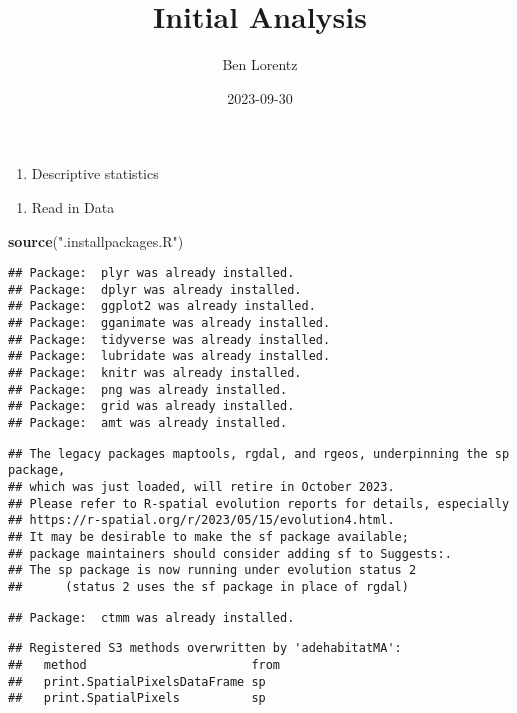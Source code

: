 \documentclass[
]{article}
\title{Initial Analysis}
\author{Ben Lorentz}
\date{2023-09-30}
\newenvironment{Shaded}{\begin{snugshade}}{\end{snugshade}}
\newcommand{\FunctionTok}[1]{\textcolor[rgb]{0.13,0.29,0.53}{\textbf{#1}}}
\newcommand{\NormalTok}[1]{#1}
\newcommand{\StringTok}[1]{\textcolor[rgb]{0.31,0.60,0.02}{#1}}
\providecommand{\tightlist}{%
  \setlength{\itemsep}{0pt}\setlength{\parskip}{0pt}}
\begin{document}
\maketitle

\begin{enumerate}
\def\labelenumi{\arabic{enumi}.}
\tightlist
\item
  Descriptive statistics
\end{enumerate}

\begin{enumerate}
\def\labelenumi{\alph{enumi}.}
\tightlist
\item
  Read in Data
\end{enumerate}

\begin{Shaded}
\begin{Highlighting}[]
\FunctionTok{source}\NormalTok{(}\StringTok{".installpackages.R"}\NormalTok{)}
\end{Highlighting}
\end{Shaded}

\begin{verbatim}
## Package:  plyr was already installed.
## Package:  dplyr was already installed.
## Package:  ggplot2 was already installed.
## Package:  gganimate was already installed.
## Package:  tidyverse was already installed.
## Package:  lubridate was already installed.
## Package:  knitr was already installed.
## Package:  png was already installed.
## Package:  grid was already installed.
## Package:  amt was already installed.
\end{verbatim}

\begin{verbatim}
## The legacy packages maptools, rgdal, and rgeos, underpinning the sp package,
## which was just loaded, will retire in October 2023.
## Please refer to R-spatial evolution reports for details, especially
## https://r-spatial.org/r/2023/05/15/evolution4.html.
## It may be desirable to make the sf package available;
## package maintainers should consider adding sf to Suggests:.
## The sp package is now running under evolution status 2
##      (status 2 uses the sf package in place of rgdal)
\end{verbatim}

\begin{verbatim}
## Package:  ctmm was already installed.
\end{verbatim}

\begin{verbatim}
## Registered S3 methods overwritten by 'adehabitatMA':
##   method                       from
##   print.SpatialPixelsDataFrame sp  
##   print.SpatialPixels          sp
\end{verbatim}
\end{document}
